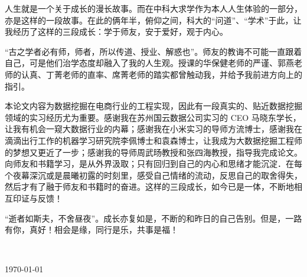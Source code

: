 
\begin{thanks}

人生就是一个关于成长的漫长故事。而在中科大求学作为本人人生体验的一部分，亦是这样的一段故事。在此的俩年半，俯仰之间，科大的“问道”、“学术”于此，让我经历了这样的三段成长：学于师友，安于爱好，观于内心。

“古之学者必有师，师者，所以传道、授业、解惑也”。师友的教诲不可能一直跟着自己，可是他们治学态度却融入了我的人生观。授课的华保健老师的严谨、郭燕老师的认真、丁菁老师的直率、席菁老师的踏实都曾触动我，并给予我前进方向上的指引。

本论文内容为数据挖掘在电商行业的工程实现，因此有一段真实的、贴近数据挖掘领域的实习经历尤为重要。感谢我在苏州国云数据公司实习的 CEO 马晓东学长，让我有机会一窥大数据行业的内幕；感谢我在小米实习的导师方流博士，感谢我在滴滴出行工作的机器学习研究院李佩博士和袁森博士，让我成为大数据挖掘工程师的梦想又更近了一步；感谢我的导师周武旸教授和张四海教授，指导我完成论文。
向师友和书籍学习，是从外界汲取；只有回归到自己的内心和思绪才能沉淀．在每个夜幕深沉或是晨曦初露的时刻里，感受自己情绪的流动，反思自己的取舍得失，然后才有了融于师友和书籍时的奋进。这样的三段成长，如今已是一体，不断地相互印证与反馈！

“逝者如斯夫，不舍昼夜”。成长亦复如是，不断的和昨日的自己告别。但是，一路有你，真好！相会是缘，同行是乐，共事是福！

\vskip 18pt

\begin{flushright}

~~~~\ustc@author~~~~

\today

\end{flushright}

\end{thanks}
